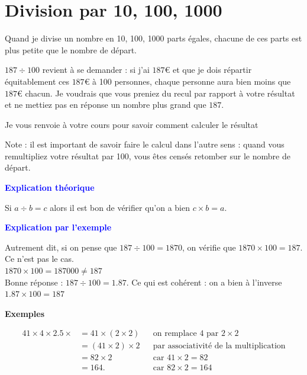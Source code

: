 \documentclass[answers]{exam}
\begin{document}
\section{Division par 10, 100, 1000}

Quand je divise un nombre en 10, 100, 1000 parts égales, chacune de ces parts est plus petite que le nombre de départ. \\

\begin{compactitem}
  \item $187 \div 100$ revient à se demander : si j'ai $187$€ et que je dois répartir équitablement ces $187$€ à 100 personnes, chaque personne aura bien moins que $187$€ chacun. Je voudrais que vous preniez du recul par rapport à votre résultat et ne mettiez pas en réponse un nombre plus grand que $187$.
  \item Je vous renvoie à votre cours pour savoir comment calculer le résultat
  \item Note : il est important de savoir faire le calcul dans l'autre sens : quand vous remultipliez votre résultat par 100, vous êtes censés retomber sur le nombre de départ. 
\end{compactitem}
 
\vspace{1em}

\begin{center}
\textbf{\textcolor{blue}{Explication théorique}} \vspace{1em}

Si $a \div b = c$ alors il est bon de vérifier qu'on a bien $c \times b = a$. \vspace{1em}

\textbf{\textcolor{blue}{Explication par l'exemple}} \vspace{1em}

Autrement dit, si on pense que $187 \div 100 = 1870$, on vérifie que $1870 \times 100 = 187$. \\
Ce n'est pas le cas. \\
$1870 \times 100 = 187 000 \neq 187$ \\ 
Bonne réponse : $187 \div 100 = 1.87$. Ce qui est cohérent : on a bien à l'inverse $1.87 \times 100 = 187$


\end{center}

\textbf{Exemples}

\begin{align*}
    41 \times 4 \times 2.5 \times 
      &= 41 \times (2 \times 2) &&\text{on remplace $4$ par $2 \times 2$} \\
      &= (41 \times 2) \times 2 &&\text{par associativité de la multiplication} \\
      &= 82 \times 2 &&\text{car } 41 \times 2 = 82 \\
      &= 164. &&\text{car } 82 \times 2 = 164
  \end{align*}
\end{document}
